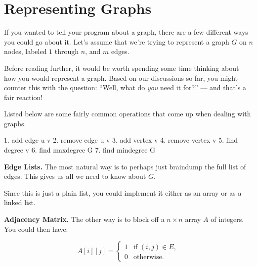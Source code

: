 \documentclass[
  letterpaper,
  DIV=11,
  numbers=noendperiod]{scrreprt}
\newenvironment{Shaded}{\begin{snugshade}}{\end{snugshade}}
\newcommand{\NormalTok}[1]{\textcolor[rgb]{0.00,0.23,0.31}{#1}}
\begin{document}
\hypertarget{representing-graphs}{%
\section{Representing Graphs}\label{representing-graphs}}

If you wanted to tell your program about a graph, there are a few
different ways you could go about it. Let's assume that we're trying to
represent a graph \(G\) on \(n\) nodes, labeled \(1\) through \(n\), and
\(m\) edges.

\begin{tcolorbox}[standard jigsaw,toptitle=1mm, titlerule=0mm, bottomtitle=1mm, title=\textcolor{quarto-callout-caution-color}{\faFire}\hspace{0.5em}{How would you do it?}, coltitle=black, colback=white, toprule=.15mm, colframe=quarto-callout-caution-color-frame, arc=.35mm, rightrule=.15mm, opacityback=0, left=2mm, leftrule=.75mm, colbacktitle=quarto-callout-caution-color!10!white, opacitybacktitle=0.6, bottomrule=.15mm]

Before reading further, it would be worth spending some time thinking
about how you would represent a graph. Based on our discussions so far,
you might counter this with the question: ``Well, what do \emph{you}
need it for?'' --- and that's a fair reaction!

Listed below are some fairly common operations that come up when dealing
with graphs.

\begin{Shaded}
\begin{Highlighting}[]
\NormalTok{1. add edge u v}
\NormalTok{2. remove edge u v}
\NormalTok{3. add vertex v}
\NormalTok{4. remove vertex v}
\NormalTok{5. find degree v}
\NormalTok{6. find maxdegree G}
\NormalTok{7. find mindegree G}
\end{Highlighting}
\end{Shaded}

\end{tcolorbox}

\textbf{Edge Lists.} The most natural way is to perhaps just braindump
the full list of edges. This gives us all we need to know about \(G\).

Since this is just a plain list, you could implement it either as an
array or as a linked list.

\textbf{Adjacency Matrix.} The other way is to block off a
\(n \times n\) array \(A\) of integers. You could then have:

\[ \begin{equation*}
   A[i][j] =
    \begin{cases}
      1 & \text{if } (i,j) \in E,\\
      0 & \text{otherwise.}
    \end{cases}
\end{equation*}
\]
\end{document}
